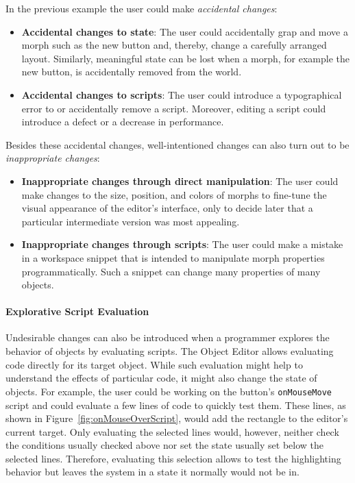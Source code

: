 In the previous example the user could make \emph{accidental changes}:

\begin{itemize}
    \item \textbf{Accidental changes to state}: The user could accidentally grap and move a morph such as the new button and, thereby, change a carefully arranged layout. Similarly, meaningful state can be lost when a morph, for example the new button, is accidentally removed from the world.
    \item \textbf{Accidental changes to scripts}: The user could introduce a typographical error to or accidentally remove a script. Moreover, editing a script could introduce a defect or a decrease in performance.
\end{itemize}

Besides these accidental changes, well-intentioned changes can also turn out to be \emph{inappropriate changes}:

\begin{itemize}
    \item \textbf{Inappropriate changes through direct manipulation}: The user could make changes to the size, position, and colors of morphs to fine-tune the visual appearance of the editor's interface, only to decide later that a particular intermediate version was most appealing.
    \item \textbf{Inappropriate changes through scripts}: The user could make a mistake in a workspace snippet that is intended to manipulate morph properties programmatically. Such a snippet can change many properties of many objects.
\end{itemize}

\paragraph{Explorative Script Evaluation}
Undesirable changes can also be introduced when a programmer explores the behavior of objects by evaluating scripts.
The Object Editor allows evaluating code directly for its target object.
While such evaluation might help to understand the effects of particular code, it might also change the state of objects.
For example, the user could be working on the button's \lstinline{onMouseMove} script and could evaluate a few lines of code to quickly test them.
These lines, as shown in Figure~\ref{fig:onMouseOverScript}, would add the rectangle to the editor's current target.
Only evaluating the selected lines would, however, neither check the conditions usually checked above nor set the state usually set below the selected lines.
Therefore, evaluating this selection allows to test the highlighting behavior but leaves the system in a state it normally would not be in.

